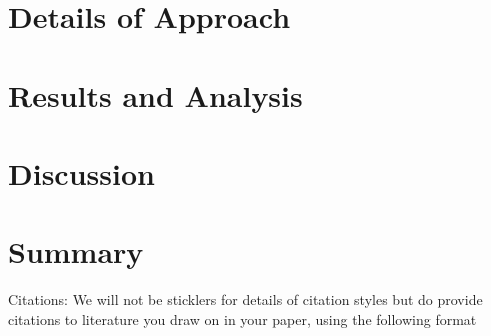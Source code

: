 \documentclass[12pt]{article}
\begin{document}

\section{Details of Approach}


\section{Results and Analysis}





\section{Discussion}




\section{Summary}

Citations:   We will not be sticklers for details of citation styles but do provide citations to literature you draw on in your paper, using the following format
\end{document}

